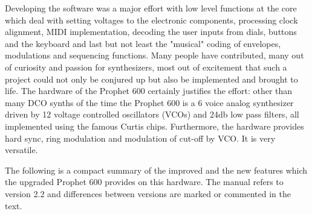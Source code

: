 \documentclass[draft,landscape, 11pt, oneside]{report}
\newenvironment{flowtext}{\addmargin[0cm]{7cm}}{\endaddmargin} %
\begin{document}
\begin{flowtext}
Developing the software was a major effort with low level functions at the core which deal with setting voltages to the electronic components, processing clock alignment, MIDI implementation, decoding the user inputs from dials, buttons and the keyboard and last but not least the "musical" coding of envelopes, modulations and sequencing functions. Many people have contributed, many out of curiosity and passion for synthesizers, most out of excitement that such a project could not only be conjured up but also be implemented and brought to life. The hardware of the Prophet 600 certainly justifies the effort: other than many DCO synths of the time the Prophet 600 is a 6 voice analog synthesizer driven by 12 voltage controlled oscillators (VCOs) and 24db low pass filters, all implemented using the famous Curtis chips\cite{curtis}. Furthermore, the hardware provides hard sync, ring modulation and modulation of cut-off by VCO. It is very versatile.

The following is a compact summary of the improved and the  new features which the upgraded Prophet 600 provides on this hardware. The manual refers to version 2.2 and differences between versions are marked or commented in the text. 


\end{flowtext}
\end{document}
